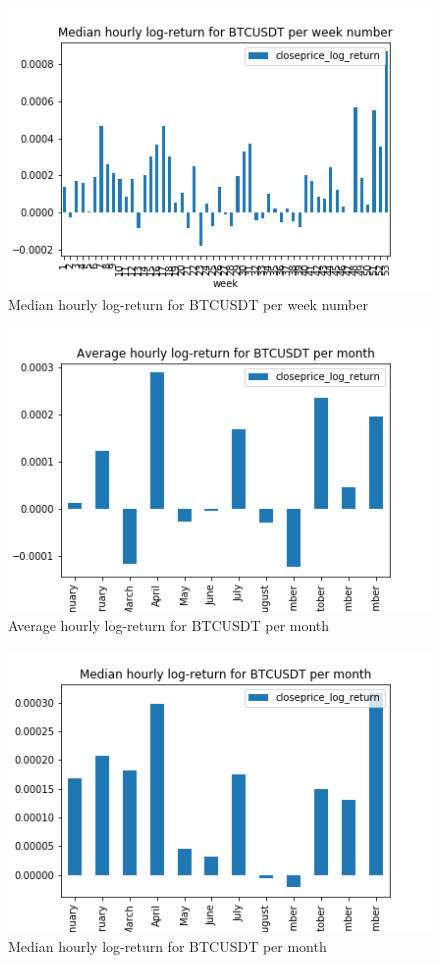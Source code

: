 \documentclass[twoside]{report}
\begin{document}
\begin{spacing}{1}
\begin{figure}[!htbp]
    \centering
    \includegraphics[scale = 0.5]{Images/Median hourly log-return for BTCUSDT per week number.png}
    \caption{Median hourly log-return for BTCUSDT per week number}
    \label{Median hourly log-return for BTCUSDT per week number}
\end{figure}

\begin{figure}[!htbp]
    \centering
    \includegraphics[scale = 0.5]{Images/Average hourly log-return for BTCUSDT per month.png}
    \caption{Average hourly log-return for BTCUSDT per month}
    \label{Average hourly log-return for BTCUSDT per month}
\end{figure}

\begin{figure}[!htbp]
    \centering
    \includegraphics[scale = 0.5]{Images/Median hourly log-return for BTCUSDT per month.png}
    \caption{Median hourly log-return for BTCUSDT per month}
    \label{Median hourly log-return for BTCUSDT per month}
\end{figure}



\end{spacing}
\end{document}
